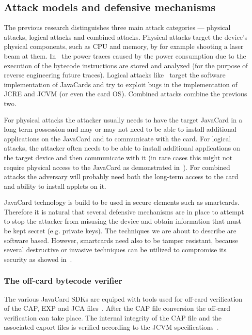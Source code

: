 \documentclass{../llncs/llncs}
\begin{document}
    \subsection{Attack models and defensive mechanisms}

    The previous research distinguishes three main attack categories --- physical attacks, logical attacks and combined attacks. Physical attacks target the device's physical components, such as CPU and memory, by for example shooting a laser beam at them. In~\cite{Prpic2010thesis} the power traces caused by the power consumption due to the execution of the bytecode instructions are stored and analyzed (for the purpose of reverse engineering future traces).
    Logical attacks like~\cite{hogenboom} target the software implementation of JavaCards and try to exploit bugs in the implementation of JCRE and JCVM (or even the card OS). Combined attacks combine the previous two.

        For physical attacks the attacker usually needs to have the target JavaCard in a long-term possession and may or may not need to be able to install additional applications on the JavaCard and to communicate with the card. For logical attacks, the attacker often needs to be able to install additional applications on the target device and then communicate with it (in rare cases this might not require physical access to the JavaCard as demonstrated in~\cite{se:gemalto:part2}). For combined attacks the adversary will probably need both the long-term access to the card and ability to install applets on it.

        JavaCard technology is build to be used in secure elements such as smartcards. Therefore it is natural that several defensive mechanisms are in place to attempt to stop the attacker from misusing the device and obtain information that must be kept secret (e.g. private keys).
The techniques we are about to describe are software based. However, smartcards need also to be tamper resistant, because several destructive or invasive techniques can be utilized to compromise its security as showed in~\cite{kommerling}.

    \subsubsection{The off-card bytecode verifier}

The various JavaCard SDKs are equiped with tools used for off-card verification of the CAP, EXP and JCA files~\cite{jcoffcardverifier}. After the CAP file conversion the off-card verification can take place. The internal integrity of the CAP file and the associated export files is verified according to the JCVM specifications~\cite{jcspecs31download}.
\end{document}
